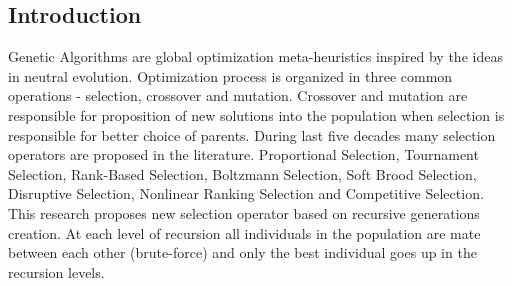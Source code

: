 \documentclass[a0,portrait,25pt]{sciposter}
\begin{document}
\begin{mdframed}[backgroundcolor=white,roundcorner=4pt,shadow=true,linewidth=1pt]
\color{Black}

\section*{Introduction}
Genetic Algorithms are global optimization meta-heuristics inspired by the ideas in neutral evolution. Optimization process is organized in three common operations - selection, crossover and mutation. Crossover and mutation are responsible for proposition of new solutions into the population when selection is responsible for better choice of parents. During last five decades many selection operators are proposed in the literature. Proportional Selection, Tournament Selection, Rank-Based Selection, Boltzmann Selection, Soft Brood Selection, Disruptive Selection, Nonlinear Ranking Selection and Competitive Selection. This research proposes new selection operator based on recursive generations creation. At each level of recursion all individuals in the population are mate between each other (brute-force) and only the best individual goes up in the recursion levels.
\end{mdframed}
\end{document}
